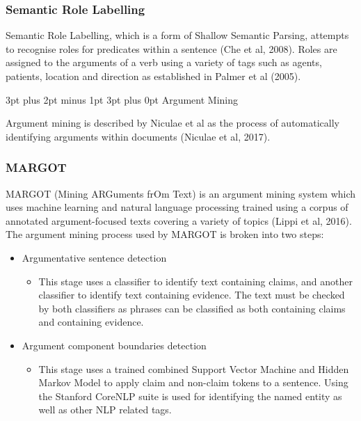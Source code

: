 \documentclass[12pt,a4paper]{article}
\makeatletter
\renewcommand\subsection{\@startsection {subsection}{1}{2mm} %
                               {3pt plus 2pt minus 1pt} %
                               {3pt plus 0pt} %
                               {\normalfont\bfseries}}
\makeatother
\begin{document}
\subsubsection{Semantic Role Labelling}

Semantic Role Labelling, which is a form of Shallow Semantic Parsing, attempts to recognise roles for predicates within a sentence (Che et al, 2008). Roles are assigned to the arguments of a verb using a variety of tags such as agents, patients, location and direction as established in Palmer et al (2005).

\subsection{Argument Mining}

Argument mining is described by Niculae et al as the process of automatically identifying arguments within documents (Niculae et al, 2017).

\subsubsection{MARGOT}

MARGOT (Mining ARGuments frOm Text) is an argument mining system which uses machine learning and natural language processing trained using a corpus of annotated argument-focused texts covering a variety of topics (Lippi et al, 2016). The argument mining process used by MARGOT is broken into two steps:

\begin{itemize}
    \item Argumentative sentence detection
    \begin{itemize}
        \item This stage uses a classifier to identify text containing claims, and another classifier to identify text containing evidence. The text must be checked by both classifiers as phrases can be classified as both containing claims and containing evidence.
    \end{itemize}
    \item Argument component boundaries detection
    \begin{itemize}
        \item This stage uses a trained combined Support Vector Machine and Hidden Markov Model to apply claim and non-claim tokens to a sentence. Using the Stanford CoreNLP suite is used for identifying the named entity as well as other NLP related tags. 
    \end{itemize}
\end{itemize}
\end{document}
